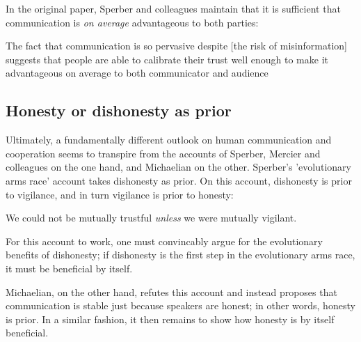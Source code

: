 In the original \citeyear{Sperber10} paper, Sperber and colleagues maintain that it is sufficient that communication is \emph{on average} advantageous to both parties:
\begin{quoting}
    The fact that communication is so pervasive despite [the risk of misinformation] suggests that people are able to calibrate their trust well enough to make it advantageous on average to both communicator and audience
    \hfill \citep[p.~360]{Sperber10}
\end{quoting}


\subsection{Honesty or dishonesty as prior}


Ultimately, a fundamentally different outlook on human communication and cooperation seems to transpire from the accounts of Sperber, Mercier and colleagues on the one hand, and Michaelian on the other. Sperber's 'evolutionary arms race' account takes dishonesty as prior. On this account, dishonesty is prior to vigilance, and in turn vigilance is prior to honesty:
\begin{quoting}
    We could not be mutually trustful \emph{unless} we were mutually vigilant.
    \hfill \citep[p.~364]{Sperber10}
\end{quoting}
For this account to work, one must convincably argue for the evolutionary benefits of dishonesty; if dishonesty is the first step in the evolutionary arms race, it must be beneficial by itself.

Michaelian, on the other hand, refutes this account and instead proposes that communication is stable just because speakers are honest; in other words, honesty is prior. In a similar fashion, it then remains to show how honesty is by itself beneficial.



